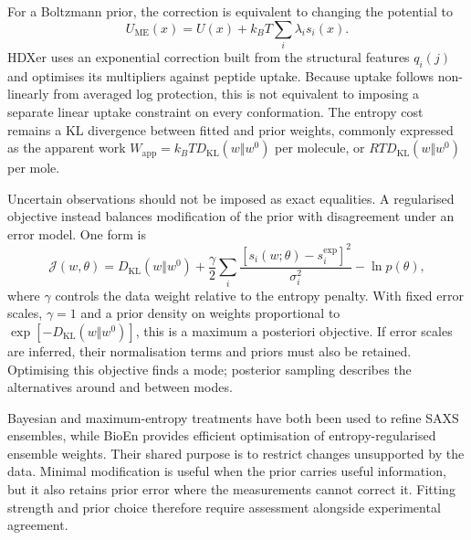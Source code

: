 For a Boltzmann prior, the correction is equivalent to changing the potential to
\begin{equation}
    U_{\text{ME}}(x)=U(x)+k_BT\sum_i\lambda_is_i(x).
    \label{eq:bg-maxent-potential}
\end{equation}
HDXer uses an exponential correction built from the structural features $q_i(j)$ and optimises its multipliers against peptide uptake.\supercite{bradshawInterpretationHDXData2020} Because uptake follows non-linearly from averaged log protection, this is not equivalent to imposing a separate linear uptake constraint on every conformation. The entropy cost remains a KL divergence between fitted and prior weights, commonly expressed as the apparent work $W_{\text{app}}=k_BT D_{\text{KL}}(w\Vert w^0)$ per molecule, or $RT D_{\text{KL}}(w\Vert w^0)$ per mole.

Uncertain observations should not be imposed as exact equalities. A regularised objective instead balances modification of the prior with disagreement under an error model. One form is
\begin{equation}
    \mathcal{J}(w,\theta)=D_{\text{KL}}(w\Vert w^0)
    +\frac{\gamma}{2}\sum_i
    \frac{[s_i(w;\theta)-s_i^{\text{exp}}]^2}{\sigma_i^2}
    -\ln p(\theta),
    \label{eq:bg-regularised-objective}
\end{equation}
where $\gamma$ controls the data weight relative to the entropy penalty. With fixed error scales, $\gamma=1$ and a prior density on weights proportional to $\exp[-D_{\text{KL}}(w\Vert w^0)]$, this is a maximum a posteriori objective.\supercite{bmsb2012ch13,bradshawInterpretationHDXData2020} If error scales are inferred, their normalisation terms and priors must also be retained. Optimising this objective finds a mode; posterior sampling describes the alternatives around and between modes.

Bayesian and maximum-entropy treatments have both been used to refine SAXS ensembles, while BioEn provides efficient optimisation of entropy-regularised ensemble weights.\supercite{chatzimagasChapterTwoStructure2023,kofingerEfficientEnsembleRefinement2019} Their shared purpose is to restrict changes unsupported by the data. Minimal modification is useful when the prior carries useful information, but it also retains prior error where the measurements cannot correct it.\supercite{cesariUsingMaximumEntropy2018} Fitting strength and prior choice therefore require assessment alongside experimental agreement.

